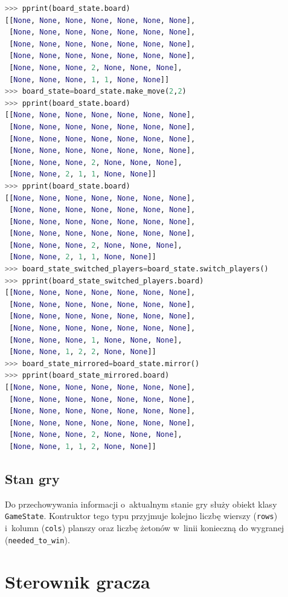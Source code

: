 \documentclass[a4paper, 12pt, oneside]{report}
\begin{document}
\begin{lstlisting}[language=Python, caption=Przekształcenia obiektów klasy \texttt{BoardState} -- sesja interaktywna interpretera]
>>> pprint(board_state.board)             
[[None, None, None, None, None, None, None],
 [None, None, None, None, None, None, None],
 [None, None, None, None, None, None, None],
 [None, None, None, None, None, None, None],
 [None, None, None, 2, None, None, None],
 [None, None, None, 1, 1, None, None]]
>>> board_state=board_state.make_move(2,2)
>>> pprint(board_state.board)             
[[None, None, None, None, None, None, None],
 [None, None, None, None, None, None, None],
 [None, None, None, None, None, None, None],
 [None, None, None, None, None, None, None],
 [None, None, None, 2, None, None, None],
 [None, None, 2, 1, 1, None, None]]
>>> pprint(board_state.board)             
[[None, None, None, None, None, None, None],
 [None, None, None, None, None, None, None],
 [None, None, None, None, None, None, None],
 [None, None, None, None, None, None, None],
 [None, None, None, 2, None, None, None],
 [None, None, 2, 1, 1, None, None]]
>>> board_state_switched_players=board_state.switch_players()
>>> pprint(board_state_switched_players.board)
[[None, None, None, None, None, None, None],
 [None, None, None, None, None, None, None],
 [None, None, None, None, None, None, None],
 [None, None, None, None, None, None, None],
 [None, None, None, 1, None, None, None],
 [None, None, 1, 2, 2, None, None]]
>>> board_state_mirrored=board_state.mirror()
>>> pprint(board_state_mirrored.board)
[[None, None, None, None, None, None, None],
 [None, None, None, None, None, None, None],
 [None, None, None, None, None, None, None],
 [None, None, None, None, None, None, None],
 [None, None, None, 2, None, None, None],
 [None, None, 1, 1, 2, None, None]]
\end{lstlisting}

\subsection{Stan gry}

Do przechowywania informacji o~aktualnym stanie gry służy obiekt klasy \texttt{GameState}. Kontruktor tego typu przyjmuje kolejno liczbę wierszy (\texttt{rows}) i~kolumn (\texttt{cols}) planszy oraz liczbę żetonów w~linii konieczną do wygranej (\texttt{needed\_to\_win}).

\section{Sterownik gracza}
\end{document}
